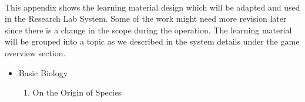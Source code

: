 \documentclass[12pt,oneside,openright,a4paper]{cpe-english-project}
\begin{document}
  \\
\label{appendix:learning-material}
This appendix shows the learning material design which will be adapted and used in the Research Lab System. Some of the work might need more revision later since there is a change in the scope during the operation. The learning material will be grouped into a topic as we described in the system details under the game overview section.

\begin{itemize}
	\item Basic Biology
	\begin{enumerate}
		\item On the Origin of Species \\
		\begin{minipage}[c]{\textwidth}\centering {}  \end{minipage}
		\begin{minipage}[c]{\textwidth}\centering {}  \end{minipage}

\end{enumerate}
\end{itemize}
\end{document}
